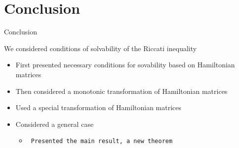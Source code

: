 %
%
\section{Conclusion}
\begin{frame}{Conclusion}


We considered conditions of solvability of the Riccati inequality

\begin{itemize}
	
	
    \item First presented necessary conditions for sovability based on Hamiltonian matrices
    \item Then considered a monotonic transformation of Hamiltonian matrices
	\item Used a special transformation of Hamiltonian matrices
    \item Considered a general case
    \begin{itemize}


    \item \texttt{ Presented the main result, a new theorem}
    \end{itemize}
    
    
		
	\end{itemize}
    


\end{frame}

